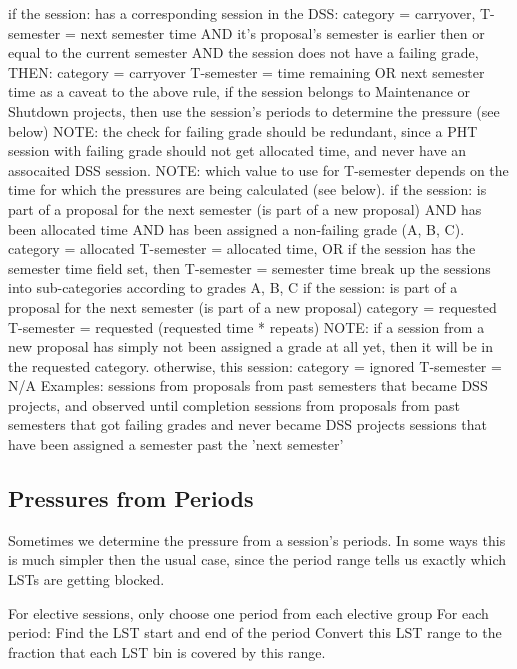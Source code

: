\documentclass{article}
\begin{document}
    if the session:
        has a corresponding session in the DSS: category = carryover, T-semester = next semester time
        AND it's proposal's semester is earlier then or equal to the current semester
        AND the session does not have a failing grade, THEN:
            category = carryover
            T-semester = time remaining OR next semester time 
        as a caveat to the above rule, if the session belongs to Maintenance or Shutdown projects, then use the session's periods to determine the pressure (see below)
        NOTE: the check for failing grade should be redundant, since a PHT session with failing grade should not get allocated time, and never have an assocaited DSS session.
        NOTE: which value to use for T-semester depends on the time for which the pressures are being calculated (see below). 
    if the session:
        is part of a proposal for the next semester (is part of a new proposal)
        AND has been allocated time
        AND has been assigned a non-failing grade (A, B, C).
            category = allocated
            T-semester = allocated time, OR if the session has the semester time field set, then T-semester = semester time
                break up the sessions into sub-categories according to grades A, B, C 
    if the session:
        is part of a proposal for the next semester (is part of a new proposal)
            category = requested
            T-semester = requested (requested time * repeats) 
        NOTE: if a session from a new proposal has simply not been assigned a grade at all yet, then it will be in the requested category. 
    otherwise, this session:
        category = ignored
        T-semester = N/A
        Examples:
            sessions from proposals from past semesters that became DSS projects, and observed until completion
            sessions from proposals from past semesters that got failing grades and never became DSS projects
            sessions that have been assigned a semester past the 'next semester' 

\subsection{Pressures from Periods}

Sometimes we determine the pressure from a session's periods. In some ways this is much simpler then the usual case, since the period range tells us exactly which LSTs are getting blocked.

    For elective sessions, only choose one period from each elective group
    For each period:
        Find the LST start and end of the period
        Convert this LST range to the fraction that each LST bin is covered by this range. 
\end{document}
